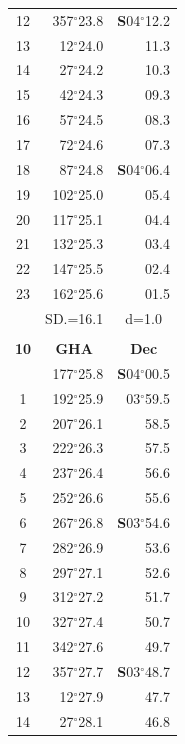 \documentclass[10pt, a4paper]{report}
\begin{document}
\begin{scriptsize}
\begin{tabular*}{0.2\textwidth}[t]{@{\extracolsep{\fill}}|c|rr|}
12 & 357$^\circ$23.8 & \textbf{S}04$^\circ$12.2\\
13 & 12$^\circ$24.0 & 11.3\\
14 & 27$^\circ$24.2 & 10.3\\
15 & 42$^\circ$24.3 & \raisebox{0.24ex}{\boldmath$\cdot$~\boldmath$\cdot$~~}09.3\\
16 & 57$^\circ$24.5 & 08.3\\
17 & 72$^\circ$24.6 & 07.3\\[2Pt]
18 & 87$^\circ$24.8 & \textbf{S}04$^\circ$06.4\\
19 & 102$^\circ$25.0 & 05.4\\
20 & 117$^\circ$25.1 & 04.4\\
21 & 132$^\circ$25.3 & \raisebox{0.24ex}{\boldmath$\cdot$~\boldmath$\cdot$~~}03.4\\
22 & 147$^\circ$25.5 & 02.4\\
23 & 162$^\circ$25.6 & 01.5\\
\hline
\rule{0pt}{2.4ex} & \multicolumn{1}{c}{SD.=16.1} & \multicolumn{1}{c|}{d=1.0}\\
\hline
\multicolumn{1}{c}{}\\[-0.5ex]\hline
\multicolumn{1}{|c|}{\rule{0pt}{2.6ex}\textbf{10}} & \multicolumn{1}{c}{\textbf{GHA}} & \multicolumn{1}{c|}{\textbf{Dec}}\\
\hline\rule{0pt}{2.6ex}\noindent
0 & 177$^\circ$25.8 & \textbf{S}04$^\circ$00.5\\
1 & 192$^\circ$25.9 & 03$^\circ$59.5\\
2 & 207$^\circ$26.1 & 58.5\\
3 & 222$^\circ$26.3 & \raisebox{0.24ex}{\boldmath$\cdot$~\boldmath$\cdot$~~}57.5\\
4 & 237$^\circ$26.4 & 56.6\\
5 & 252$^\circ$26.6 & 55.6\\[2Pt]
6 & 267$^\circ$26.8 & \textbf{S}03$^\circ$54.6\\
7 & 282$^\circ$26.9 & 53.6\\
8 & 297$^\circ$27.1 & 52.6\\
9 & 312$^\circ$27.2 & \raisebox{0.24ex}{\boldmath$\cdot$~\boldmath$\cdot$~~}51.7\\
10 & 327$^\circ$27.4 & 50.7\\
11 & 342$^\circ$27.6 & 49.7\\[2Pt]
12 & 357$^\circ$27.7 & \textbf{S}03$^\circ$48.7\\
13 & 12$^\circ$27.9 & 47.7\\
14 & 27$^\circ$28.1 & 46.8\\

\end{tabular*}
\end{scriptsize}
\end{document}
